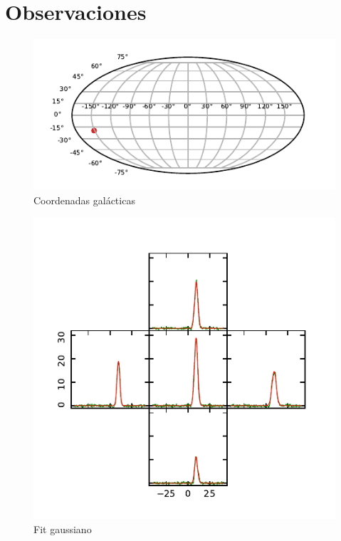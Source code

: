 \section{Observaciones}

\begin{figure}[htbp]
	\centering
	\includegraphics{lb.pdf}
	\caption{Coordenadas galácticas}
	\label{fig:lb}
\end{figure}

\begin{figure}[htbp]
	\centering
	\includegraphics{specfit1.pdf}
	\caption{Fit gaussiano}
	\label{fig:specfit1}
\end{figure}